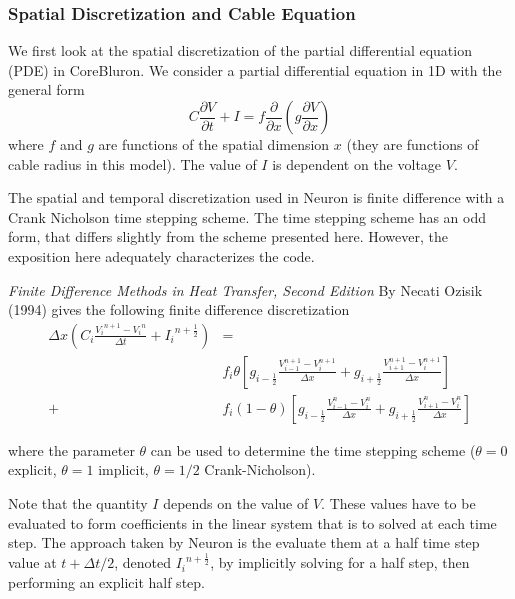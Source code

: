 \documentclass[11pt,a4paper]{article}
\newcommand{\pder}[2]{\frac{\partial{#1}}{\partial{#2}}} %
\newcommand{\neuron}{CoreBluron} %
\newcommand{\dx}{{\Delta x}} %
\newcommand{\dt}{{\Delta t}} %
\newcommand{\at}[1]{{#1}_{i}} %
\newcommand{\atplus}[1]{{#1}_{i+1}} %
\newcommand{\atminus}[1]{{#1}_{i-1}} %
\newcommand{\atplushalf}[1]{{#1}_{i+\frac{1}{2}}} %
\newcommand{\atminushalf}[1]{{#1}_{i-\frac{1}{2}}} %
\newcommand{\att}[1]{{#1}^{n}} %
\newcommand{\attplus}[1]{{#1}^{n+1}} %
\newcommand{\attplushalf}[1]{{#1}^{n+\frac{1}{2}}} %
\begin{document}
\subsubsection{Spatial Discretization and Cable Equation}
We first look at the spatial discretization of the partial differential equation (PDE) in \neuron. We consider a partial differential equation in 1D with the general form
\begin{equation}
     C\pder{V}{t} + I = f \pder{}{x} \left( g\pder{V}{x} \right)
\end{equation}
where $f$ and $g$ are functions of the spatial dimension $x$ (they are functions of cable radius in this model). The value of $I$ is dependent on the voltage $V$.

The spatial and temporal discretization used in Neuron is finite difference with a Crank Nicholson time stepping scheme. The time stepping scheme has an odd form, that differs slightly from the scheme presented here. However, the exposition here adequately characterizes the code.

\emph{Finite Difference Methods in Heat Transfer, Second Edition} By Necati Ozisik (1994) gives the following finite difference discretization
\begin{align}
    \dx \left(\at{C} \frac{\attplus{\at{V}} - \att{\at{V}}}{\dt} + \attplushalf{\at{I}} \right)
    &=\nonumber \\
    & \at{f} \theta
            \left[
                \atminushalf{g} \frac{\atminus{V}^{n+1}-\at{V}^{n+1}}{\dx}
              + \atplushalf{g}  \frac{\atplus{V}^{n+1}-\at{V}^{n+1}}{\dx}
            \right] \nonumber \\
            + & \at{f} (1-\theta)
            \left[
                \atminushalf{g} \frac{\atminus{V}^{n}-\at{V}^{n}}{\dx}
              + \atplushalf{g}  \frac{\atplus{V}^{n}-\at{V}^{n}}{\dx}
            \right]
        \label{eq:cableDiscretization}
\end{align}

where the parameter $\theta$ can be used to determine the time stepping scheme ($\theta=0$ explicit, $\theta=1$ implicit, $\theta=1/2$ Crank-Nicholson).

Note that the quantity $I$ depends on the value of $V$. These values have to be evaluated to form coefficients in the linear system that is to solved at each time step. The approach taken by Neuron is the evaluate them at a half time step value at $t+\dt/2$, denoted $\attplushalf{\at{I}}$, by implicitly solving for a half step, then performing an explicit half step.
\end{document}
